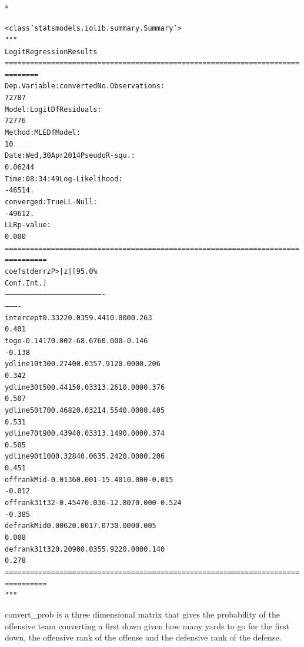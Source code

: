 \documentclass[letterpaper,10pt,english]{/anaconda/lib/python2.7/site-packages/sphinx/texinputs/sphinxhowto}
\def\smaller{\fontsize{9.5pt}{9.5pt}\selectfont}
\newenvironment{InvisibleVerbatim}
        {\begin{mdframed}[leftmargin=0.1\linewidth,innerleftmargin=3pt,innerrightmargin=3pt, userdefinedwidth=1\linewidth, linewidth=0pt, linecolor=white, usetwoside=false]}
        {\end{mdframed}}
\begin{document}
                \makebox[0.1\linewidth]{\smaller\hfill\tt\color{nbframe-out-prompt}Out\hspace{4pt}{[}27{]}:\hspace{4pt}}\\*
                \vspace{-2.55\baselineskip}\begin{InvisibleVerbatim}
                \vspace{-0.5\baselineskip}
\begin{alltt}<class 'statsmodels.iolib.summary.Summary'>
"""
                           Logit Regression Results
======================================================================
========
Dep. Variable:              converted   No. Observations:
72787
Model:                          Logit   Df Residuals:
72776
Method:                           MLE   Df Model:
10
Date:                Wed, 30 Apr 2014   Pseudo R-squ.:
0.06244
Time:                        08:34:49   Log-Likelihood:
-46514.
converged:                       True   LL-Null:
-49612.
                                        LLR p-value:
0.000
======================================================================
==========
                   coef    std err          z      P>|z|      [95.0\%
Conf. Int.]
----------------------------------------------------------------------
----------
intercept        0.3322      0.035      9.441      0.000         0.263
0.401
togo            -0.1417      0.002    -68.676      0.000        -0.146
-0.138
ydline10t30      0.2740      0.035      7.912      0.000         0.206
0.342
ydline30t50      0.4415      0.033     13.261      0.000         0.376
0.507
ydline50t70      0.4682      0.032     14.554      0.000         0.405
0.531
ydline70t90      0.4394      0.033     13.149      0.000         0.374
0.505
ydline90t100     0.3284      0.063      5.242      0.000         0.206
0.451
offrankMid      -0.0136      0.001    -15.401      0.000        -0.015
-0.012
offrank31t32    -0.4547      0.036    -12.807      0.000        -0.524
-0.385
defrankMid       0.0062      0.001      7.073      0.000         0.005
0.008
defrank31t32     0.2090      0.035      5.922      0.000         0.140
0.278
======================================================================
==========
"""\end{alltt}

            \end{InvisibleVerbatim}
            
        
    

convert\_prob is a three dimensional matrix that gives the probability
of the offensive team converting a first down given how many yards to go
for the first down, the offensive rank of the offense and the defensive
rank of the defense.
\end{document}

